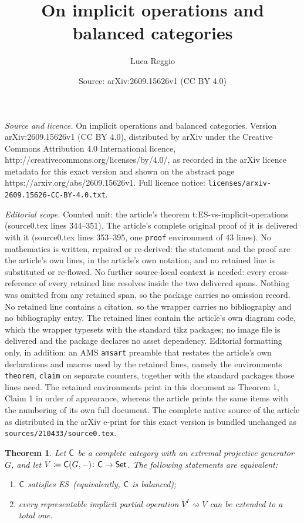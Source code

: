 \documentclass[10pt,a4paper]{amsart}
\title{On implicit operations and balanced categories}
\author{Luca Reggio}
\date{Source: arXiv:2609.15626v1 (CC BY 4.0)}
\newtheorem{theorem}{Theorem}
\newcommand{\ES}{\textnormal{ES}}
\newcommand{\Set}{{\sf Set}}							%
\newcommand{\cat}{{\sf C}}								%
\begin{document}
\maketitle

\noindent\emph{Source and licence.} On implicit operations and balanced categories. Version arXiv:2609.15626v1 (CC BY 4.0), distributed by arXiv under the Creative Commons Attribution 4.0 International licence, http://creativecommons.org/licenses/by/4.0/, as recorded in the arXiv licence metadata for this exact version and shown on the abstract page https://arxiv.org/abs/2609.15626v1. Full licence notice: \texttt{licenses/arxiv-2609.15626-CC-BY-4.0.txt}.\par\smallskip

\noindent\textit{Editorial scope.} Counted unit: the article's theorem t:ES-vs-implicit-operations (source0.tex lines 344--351). The article's complete original proof of it is delivered with it (source0.tex lines 353--395, one \texttt{proof} environment of 43 lines). No mathematics is written, repaired or re-derived: the statement and the proof are the article's own lines, in the article's own notation, and no retained line is substituted or re-flowed.  No further source-local context is needed: every cross-reference of every retained line resolves inside the two delivered spans.  Nothing was omitted from any retained span, so the package carries no omission record.  No retained line contains a citation, so the wrapper carries no bibliography and no bibliography entry.  The retained lines contain the article's own diagram code, which the wrapper typesets with the standard tikz packages; no image file is delivered and the package declares no asset dependency.  Editorial formatting only, in addition: an AMS \texttt{amsart} preamble that restates the article's own declarations and macros used by the retained lines, namely the environments \texttt{theorem}, \texttt{claim} on separate counters, together with the standard packages those lines need.  The retained environments print in this document as Theorem 1, Claim 1 in order of appearance, whereas the article prints the same items with the numbering of its own full document.  The complete native source of the article as distributed in the arXiv e-print for this exact version is bundled unchanged as \texttt{sources/210433/source0.tex}.
\begin{theorem}\label{t:ES-vs-implicit-operations}
Let $\cat$ be a complete category with an extremal projective generator~$G$, and let $V\coloneqq \cat(G,-)\colon\cat\to\Set$. The following statements are equivalent:
%
\begin{enumerate}[label=(\arabic*),series=implicitops]
\item\label{i:Cat-satisfies-ES} $\cat$ satisfies \ES~(equivalently, $\cat$ is balanced);
\item\label{i:representable-admits-extension} every representable implicit partial operation $V^{I} \rightsquigarrow V$ can be extended to a total one.
\end{enumerate}
\end{theorem}
\end{document}
